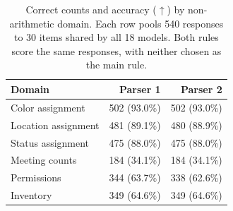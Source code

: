 \begin{table}[!b]
\centering
\small
\setlength{\tabcolsep}{4pt}
\begin{tabular}{@{}lrr@{}}
\toprule
Domain & Parser 1 & Parser 2 \\
\midrule
Color assignment & 502 (93.0\%) & 502 (93.0\%) \\
Location assignment & 481 (89.1\%) & 480 (88.9\%) \\
Status assignment & 475 (88.0\%) & 475 (88.0\%) \\
\midrule Meeting counts & 184 (34.1\%) & 184 (34.1\%) \\
Permissions & 344 (63.7\%) & 338 (62.6\%) \\
Inventory & 349 (64.6\%) & 349 (64.6\%) \\
\bottomrule
\end{tabular}
\caption{Correct counts and accuracy ($\uparrow$) by non-arithmetic domain. Each row pools 540 responses to 30 items shared by all 18 models. Both rules score the same responses, with neither chosen as the main rule.}
\label{tab:ef-domain-summary}
\end{table}
